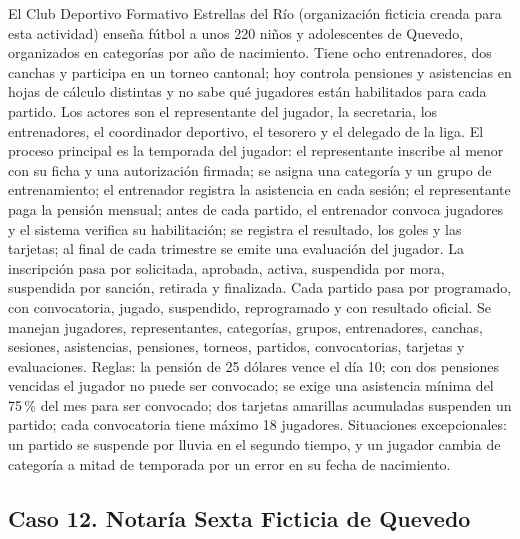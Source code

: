 \documentclass[11pt]{article}
\newcommand{\subseccion}[1]{\subsection{\textcolor{midblue}{#1}}}
\begin{document}
El Club Deportivo Formativo Estrellas del Río (organización ficticia creada para esta actividad) enseña fútbol a unos 220 niños y adolescentes de Quevedo, organizados en categorías por año de nacimiento. Tiene ocho entrenadores, dos canchas y participa en un torneo cantonal; hoy controla pensiones y asistencias en hojas de cálculo distintas y no sabe qué jugadores están habilitados para cada partido. Los actores son el representante del jugador, la secretaria, los entrenadores, el coordinador deportivo, el tesorero y el delegado de la liga. El proceso principal es la temporada del jugador: el representante inscribe al menor con su ficha y una autorización firmada; se asigna una categoría y un grupo de entrenamiento; el entrenador registra la asistencia en cada sesión; el representante paga la pensión mensual; antes de cada partido, el entrenador convoca jugadores y el sistema verifica su habilitación; se registra el resultado, los goles y las tarjetas; al final de cada trimestre se emite una evaluación del jugador. La inscripción pasa por solicitada, aprobada, activa, suspendida por mora, suspendida por sanción, retirada y finalizada. Cada partido pasa por programado, con convocatoria, jugado, suspendido, reprogramado y con resultado oficial. Se manejan jugadores, representantes, categorías, grupos, entrenadores, canchas, sesiones, asistencias, pensiones, torneos, partidos, convocatorias, tarjetas y evaluaciones. Reglas: la pensión de 25 dólares vence el día 10; con dos pensiones vencidas el jugador no puede ser convocado; se exige una asistencia mínima del 75\,\% del mes para ser convocado; dos tarjetas amarillas acumuladas suspenden un partido; cada convocatoria tiene máximo 18 jugadores. Situaciones excepcionales: un partido se suspende por lluvia en el segundo tiempo, y un jugador cambia de categoría a mitad de temporada por un error en su fecha de nacimiento.

\subseccion{Caso 12. Notaría Sexta Ficticia de Quevedo}
\end{document}
